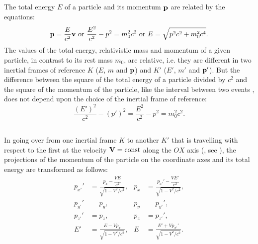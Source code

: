 \subsection{}\label{5.7.4} The total energy $E$ of a particle and its momentum $\vb{p}$ are related by the equations:
\begin{equation*}%
\vb{p} = \frac{E}{c^{2}} \vb{v} \,\, \textrm{or} \,\, \frac{E^{2}}{c^{2}} - p^{2} = m_{0}^{2}c^{2}  \,\, \textrm{or} \,\, E = \sqrt{p^{2}c^{2}+m_{0}^{2}c^{4}}.
\end{equation*}
The values of the total energy, relativistic mass and momentum of a given particle, in contrast to its rest mass $m_{0}$, are relative, i.e. they are different in two inertial frames of reference $K$ ($E$, $m$ and $\vb{p}$) and $K'$ ($E'$, $m'$ and $\vb{p}'$). But the difference between the square of the total energy of a particle divided by $c^{2}$ and the square of the momentum of the particle, like the interval between two events , does not depend upon the choice of the inertial frame of reference:
\begin{equation*}%
\frac{(E')^{2}}{c^{2}} - (p')^{2} = \frac{E^{2}}{c^{2}} - p^{2} = m_{0}^{2}c^{2}.
\end{equation*}

\subsection{}\label{5.7.5} In going over from one inertial frame $K$ to another $K'$ that is travelling with respect to the first at the velocity $\vb{V} = \textrm{const}$ along the $OX$ axis (, see ), the projections of the momentum of the particle on the coordinate axes and its total energy are transformed as follows:
\begin{align*}%
p_{x'}' & = \frac{p_{x} - \dfrac{VE}{c^{2}}}{\sqrt{1 - V^{2}/c^{2}}}, & p_{x} &=\frac{p_{x'}' - \dfrac{VE'}{c^{2}}}{\sqrt{1 - V^{2}/c^{2}}},\\
p_{y'}' & = p_{y}, & p_{y} & = p_{y'}', \\
p_{z'}' & = p_{z}, & p_{z} & = p_{z'}', \\
E' & = \frac{E - Vp_{x}}{\sqrt{1 - V^{2}/c^{2}}}, & E &= \frac{E' + Vp_{x'}'}{\sqrt{1 - V^{2}/c^{2}}}.\\
\end{align*}
